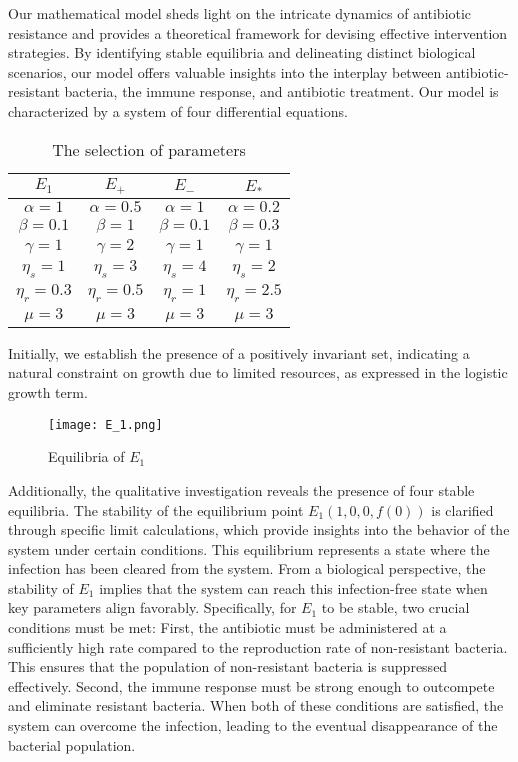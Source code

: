 
Our mathematical model sheds light on the intricate dynamics of antibiotic resistance and provides a theoretical framework for devising effective intervention strategies. By identifying stable equilibria and delineating distinct biological scenarios, our model offers valuable insights into the interplay between antibiotic-resistant bacteria, the immune response, and antibiotic treatment. Our model is characterized by a system of four differential equations.

\begin{table}[ht]
\centering
\caption{The selection of parameters}
\label{tab:parameters}
\begin{tabular}{cccc}
\hline
\textbf{$E_1$} & \textbf{$E_+$} & \textbf{$E_-$} & \textbf{$E_*$} \\ 
\hline
$\alpha = 1$ & $\alpha = 0.5$ & $\alpha = 1$ & $\alpha = 0.2$ \\
$\beta = 0.1$ & $\beta = 1$ & $\beta = 0.1$ & $\beta = 0.3$ \\
$\gamma = 1$ & $\gamma = 2$ & $\gamma = 1$ & $\gamma = 1$ \\
$\eta_s = 1$ & $\eta_s = 3$ & $\eta_s = 4$ & $\eta_s = 2$ \\
$\eta_r = 0.3$ & $\eta_r = 0.5$ & $\eta_r = 1$ & $\eta_r = 2.5$ \\
$\mu = 3$ & $\mu = 3$ & $\mu = 3$ & $\mu = 3$ \\
\hline
\end{tabular}
\end{table}


Initially, we establish the presence of a positively invariant set, indicating a natural constraint on growth due to limited resources, as expressed in the logistic growth term.

\begin{figure}
    \centering
    \caption{Equilibria of $E_1$}
    \label{fig:e1}
    \texttt{[image: E\_1.png]}
\end{figure}


Additionally, the qualitative investigation reveals the presence of four stable equilibria. The stability of the equilibrium point $E_1 \left(1, 0, 0, f(0)\right)$ is clarified through specific limit calculations, which provide insights into the behavior of the system under certain conditions. This equilibrium represents a state where the infection has been cleared from the system. From a biological perspective, the stability of $E_1$ implies that the system can reach this infection-free state when key parameters align favorably. Specifically, for $E_1$ to be stable, two crucial conditions must be met: First, the antibiotic must be administered at a sufficiently high rate compared to the reproduction rate of non-resistant bacteria. This ensures that the population of non-resistant bacteria is suppressed effectively. Second, the immune response must be strong enough to outcompete and eliminate resistant bacteria. When both of these conditions are satisfied, the system can overcome the infection, leading to the eventual disappearance of the bacterial population.


